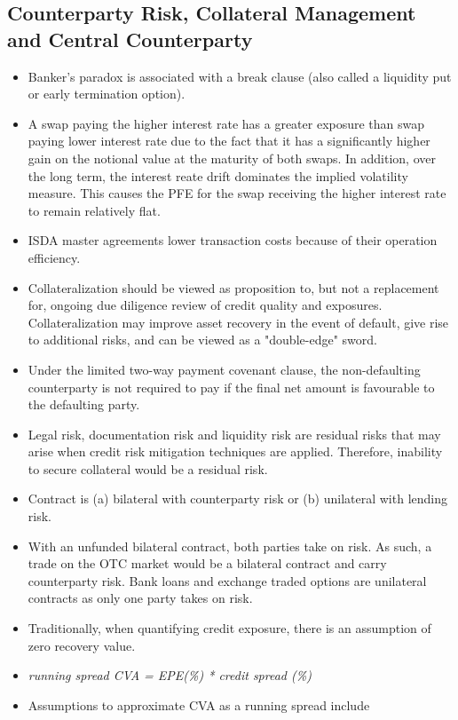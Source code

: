 \subsection{Counterparty Risk, Collateral Management and Central Counterparty}
\begin{itemize}
	\item Banker's paradox is associated with a break clause (also called a liquidity put or early termination option).
	\item A swap paying the higher interest rate has a greater exposure than swap paying lower interest rate due to the fact that it has a significantly higher gain on the notional value at the maturity of both swaps. In addition, over the long term, the interest reate drift dominates the implied volatility measure. This causes the PFE for the swap receiving the higher interest rate to remain relatively flat.
	\item ISDA master agreements lower transaction costs because of their operation efficiency.
	\item Collateralization should be viewed as proposition to, but not a replacement for, ongoing due diligence review of credit quality and exposures. Collateralization may improve asset recovery in the event of default, give rise to additional risks, and can be viewed as a "double-edge" sword.
	\item Under the limited two-way payment covenant clause, the non-defaulting counterparty is not required to pay if the final net amount is favourable to the defaulting party.
	\item Legal risk, documentation risk and liquidity risk are residual risks that may arise when credit risk mitigation techniques are applied. Therefore, inability to secure collateral would be a residual risk.
	\item Contract is (a) bilateral with counterparty risk or (b) unilateral with lending risk.
	\item With an unfunded bilateral contract, both parties take on risk. As such, a trade on the OTC market would be a bilateral contract and carry counterparty risk. Bank loans and exchange traded options are unilateral contracts as only one party takes on risk.
	\item Traditionally, when quantifying credit exposure, there is an assumption of zero recovery value.
	\item \textit{running spread CVA  = EPE(\%) * credit spread (\%)}
	\item Assumptions to approximate CVA as a running spread include

\end{itemize}
